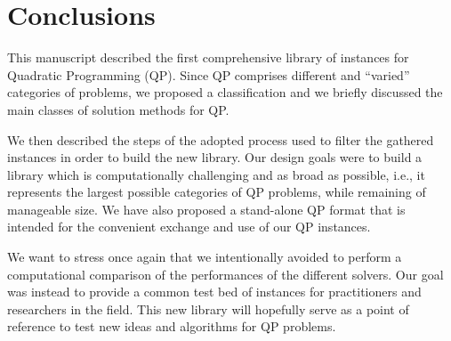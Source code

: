 \section{Conclusions}\label{sec:conclusions}

This manuscript described the first comprehensive library of instances for Quadratic Programming (QP). Since QP comprises  different and ``varied'' categories of problems, we proposed a classification and we briefly discussed the main classes of solution methods for QP.

We then described the steps of the adopted process used to filter the gathered instances  in order to build the new library. Our design goals were to build a library which is computationally challenging and as broad as possible, i.e., it represents the largest possible categories of QP problems, while remaining of manageable size. We have also proposed a stand-alone QP format that is intended
for the convenient exchange and use of our QP instances.

We want to stress once again that we intentionally avoided to perform a computational comparison of the performances of the different solvers. Our goal was instead to provide a common test bed of instances for practitioners and researchers in the field. This new library will hopefully serve as a point of reference to test new ideas and algorithms for QP problems.
